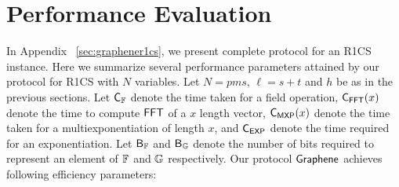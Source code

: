 \section{Performance Evaluation}\label{sec:performancecompare} 
In Appendix ~\ref{sec:graphener1cs}, we present complete protocol for an R1CS
instance. Here we summarize several performance parameters attained by our protocol for 
R1CS with $N$ variables. Let $N= pms$, $\ell = s+t$ and $h$ be as in the previous sections. Let $\mathsf{C}_\mathbb{F}$ denote the time taken for a field operation, $\mathsf{C}_\mathsf{FFT}(x)$ denote the time to compute $\mathsf{FFT}$ of a $x$ length vector, $\mathsf{C}_\mathsf{MXP}(x)$ denote the time taken for a multiexponentiation of length $x$, and $\mathsf{C}_\mathsf{EXP}$ denote the time required for an exponentiation. Let $\mathsf{B}_\mathbb{F}$ and $\mathsf{B}_\mathbb{G}$ denote the number of bits required to represent an element of $\mathbb{F}$ and $\mathbb{G}$ respectively. Our protocol $\textsf{Graphene}$ achieves following efficiency parameters: 

